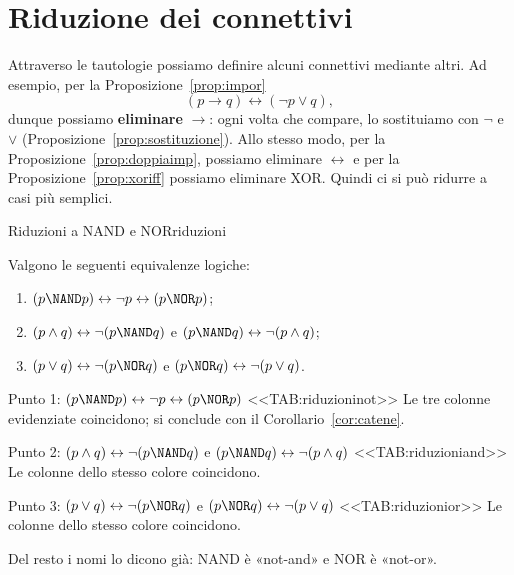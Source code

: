 \section{Riduzione dei connettivi}\label{sec:riduzione}

Attraverso le tautologie possiamo definire alcuni connettivi mediante altri. Ad esempio, per la
Proposizione~\ref{prop:impor}
\[ (p \rightarrow q) \leftrightarrow (\neg p \vee q), \]
dunque possiamo \textbf{eliminare} $\rightarrow$: ogni volta che compare, lo sostituiamo con $\neg$ e $\vee$
(Proposizione~\ref{prop:sostituzione}). Allo stesso modo, per la Proposizione~\ref{prop:doppiaimp}, possiamo eliminare
$\leftrightarrow$ e per la Proposizione~\ref{prop:xoriff} possiamo eliminare XOR. Quindi ci si può ridurre a casi più semplici.

\begin{concetto}
\begin{Proposizione}{Riduzioni a NAND e NOR}{riduzioni}
    \begin{prerequisiti}
    \end{prerequisiti}
    Valgono le seguenti equivalenze logiche:
    \begin{enumerate}
        \item $(p \NAND p) \leftrightarrow \neg p \leftrightarrow (p \NOR p)$;
        \item $(p \wedge q) \leftrightarrow \neg(p \NAND q)$ \quad e \quad $(p \NAND q) \leftrightarrow \neg(p \wedge q)$;
        \item $(p \vee q) \leftrightarrow \neg(p \NOR q)$ \quad e \quad $(p \NOR q) \leftrightarrow \neg(p \vee q)$.
    \end{enumerate}
\end{Proposizione}

\begin{dimostrazione}
    \begin{caso}{Punto 1: $(p \NAND p) \leftrightarrow \neg p \leftrightarrow (p \NOR p)$}
        <<TAB:riduzioninot>>
        Le tre colonne evidenziate coincidono; si conclude con il Corollario~\ref{cor:catene}.
    \end{caso}
    \begin{caso}{Punto 2: $(p \wedge q) \leftrightarrow \neg(p \NAND q)$ e $(p \NAND q) \leftrightarrow \neg(p \wedge q)$}
        <<TAB:riduzioniand>>
        Le colonne dello stesso colore coincidono.
    \end{caso}
    \begin{caso}{Punto 3: $(p \vee q) \leftrightarrow \neg(p \NOR q)$ e $(p \NOR q) \leftrightarrow \neg(p \vee q)$}
        <<TAB:riduzionior>>
        Le colonne dello stesso colore coincidono.
    \end{caso}
    Del resto i nomi lo dicono già: NAND è «not-and» e NOR è «not-or».
\end{dimostrazione}
\end{concetto}

